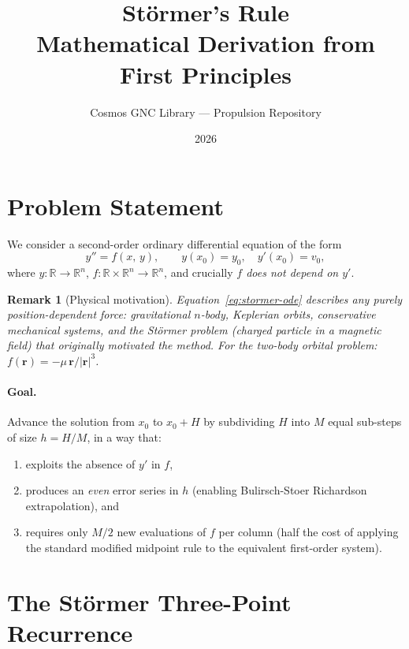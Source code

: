 \documentclass[11pt]{article}
\title{\textbf{Störmer's Rule}\\
       \large Mathematical Derivation from First Principles}
\author{Cosmos GNC Library --- Propulsion Repository}
\date{2026}
\newtheorem{remark}{Remark}
\begin{document}
\maketitle
\tableofcontents
\bigskip

\section{Problem Statement}

We consider a second-order ordinary differential equation of the form
\begin{equation}
  \label{eq:stormer-ode}
  y'' = f(x,\, y),
  \qquad y(x_0) = y_0,\quad y'(x_0) = v_0,
\end{equation}
where $y : \mathbb{R} \to \mathbb{R}^n$, $f : \mathbb{R} \times \mathbb{R}^n \to
\mathbb{R}^n$, and crucially \emph{$f$ does not depend on $y'$}.

\begin{remark}[Physical motivation]
  Equation~\eqref{eq:stormer-ode} describes any purely position-dependent force:
  gravitational $n$-body, Keplerian orbits, conservative mechanical systems, and
  the Störmer problem (charged particle in a magnetic field) that originally
  motivated the method.  For the two-body orbital problem:
  $f(\mathbf{r}) = -\mu\,\mathbf{r}/|\mathbf{r}|^3$.
\end{remark}

\paragraph{Goal.}
Advance the solution from $x_0$ to $x_0 + H$ by subdividing $H$ into $M$ equal
sub-steps of size $h = H/M$, in a way that:
\begin{enumerate}
  \item exploits the absence of $y'$ in $f$,
  \item produces an \emph{even} error series in $h$ (enabling Bulirsch-Stoer
        Richardson extrapolation), and
  \item requires only $M/2$ new evaluations of $f$ per column (half the cost of
        applying the standard modified midpoint rule to the equivalent first-order
        system).
\end{enumerate}

\section{The Störmer Three-Point Recurrence}
\label{sec:stormer-3pt}
\end{document}

